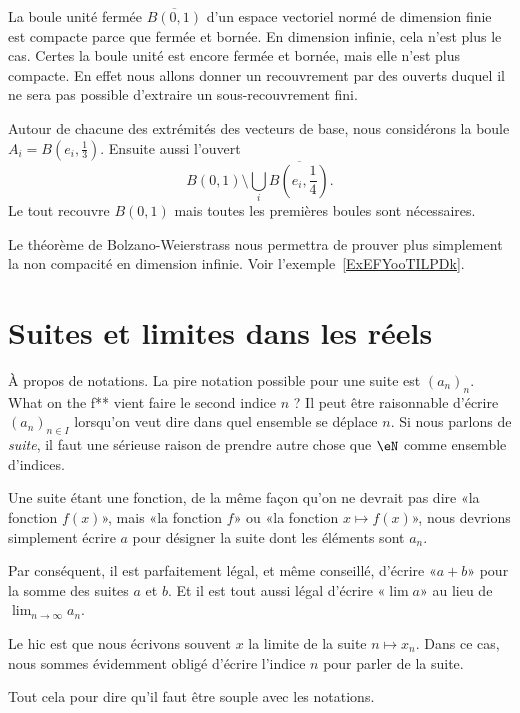 \begin{example}
    La boule unité fermée \( \overline{ B(0,1) }\) d'un espace vectoriel normé de dimension finie est compacte parce que fermée et bornée. En dimension infinie, cela n'est plus le cas. Certes la boule unité est encore fermée et bornée, mais elle n'est plus compacte. En effet nous allons donner un recouvrement par des ouverts duquel il ne sera pas possible d'extraire un sous-recouvrement fini.

    Autour de chacune des extrémités des vecteurs de base, nous considérons la boule \( A_i=B(e_i,\frac{1}{ 3 })\). Ensuite aussi l'ouvert
    \begin{equation}
        B(0,1)\setminus\bigcup_i\overline{ B(e_i,\frac{1}{ 4 })}.
    \end{equation}
    Le tout recouvre \( B(0,1)\) mais toutes les premières boules sont nécessaires.
\end{example}

Le théorème de Bolzano-Weierstrass nous permettra de prouver plus simplement la non compacité en dimension infinie. Voir l'exemple~\ref{ExEFYooTILPDk}.

\section{Suites et limites dans les réels}
\label{SECooLLUGooOwZRyI}

\begin{normaltext}
    À propos de notations. La pire notation possible pour une suite est \( (a_n)_n\). What on the f** vient faire le second indice \( n\) ? Il peut être raisonnable d'écrire \( (a_n)_{n\in I}\) lorsqu'on veut dire dans quel ensemble se déplace \( n\). Si nous parlons de \emph{suite}, il faut une sérieuse raison de prendre autre chose que \( \eN\) comme ensemble d'indices.

    Une suite étant une fonction, de la même façon qu'on ne devrait pas dire «la fonction \( f(x)\)», mais «la fonction \( f\)» ou «la fonction \( x\mapsto f(x)\)», nous devrions simplement écrire \( a\) pour désigner la suite dont les éléments sont \( a_n\). 

    Par conséquent, il est parfaitement légal, et même conseillé, d'écrire «\( a+b\)» pour la somme des suites \( a\) et \( b\). Et il est tout aussi légal d'écrire «\( \lim a\)» au lieu de \( \lim_{n\to \infty} a_n\).

    Le hic est que nous écrivons souvent \( x\) la limite de la suite \( n\mapsto x_n\). Dans ce cas, nous sommes évidemment obligé d'écrire l'indice \( n\) pour parler de la suite.

    Tout cela pour dire qu'il faut être souple avec les notations.
\end{normaltext}

